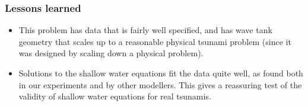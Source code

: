 \subsubsection{Lessons learned}

\begin{itemize}
\item This problem has data that is fairly well specified, and has wave tank
geometry that scales up to a reasonable physical tsunami problem (since it
was designed by scaling down a physical problem).  

\item Solutions to the shallow water equations fit the data quite well, as
found both in our experiments and by other modellers.  This gives a
reassuring test of the validity of shallow water equations for real
tsunamis.

\end{itemize} 
